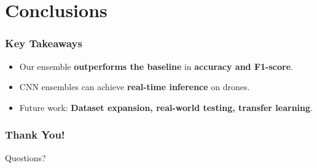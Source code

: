 \section{Conclusions}
\label{sec:conclusions}

\begin{frame}
    \frametitle{Key Takeaways}
    \begin{itemize}
        \item Our ensemble \textbf{outperforms the baseline} in \textbf{accuracy and F1-score}.
        \item CNN ensembles can achieve \textbf{real-time inference} on drones.
        \item Future work: \textbf{Dataset expansion, real-world testing, transfer learning}.
    \end{itemize}
\end{frame}

\begin{frame}
    \frametitle{Thank You!}
    \Huge{\centering Questions?}
\end{frame}